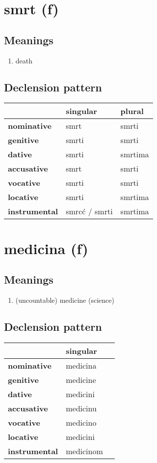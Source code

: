 \filbreak
\section{smrt (f)}
\subsection*{Meanings}
\begin{enumerate}
\item death
\end{enumerate}
\subsection*{Declension pattern}
\begin{tabularx}{\linewidth}{Xll}
\toprule
{} &       singular &   plural \\
\midrule
\textbf{nominative  } &           smrt &    smrti \\
\textbf{genitive    } &          smrti &   smrti \\
\textbf{dative      } &          smrti &  smrtima \\
\textbf{accusative  } &           smrt &    smrti \\
\textbf{vocative    } &          smrti &    smrti \\
\textbf{locative    } &          smrti &  smrtima \\
\textbf{instrumental} &  smrcć / smrti &  smrtima \\
\bottomrule
\end{tabularx}

\filbreak
\section{medicina (f)}
\subsection*{Meanings}
\begin{enumerate}
\item (uncountable) medicine (science)
\end{enumerate}
\subsection*{Declension pattern}
\begin{tabularx}{\linewidth}{Xll}
\toprule
{} &   singular \\
\midrule
\textbf{nominative  } &   medicina \\
\textbf{genitive    } &   medicine \\
\textbf{dative      } &   medicini \\
\textbf{accusative  } &   medicinu \\
\textbf{vocative    } &   medicino \\
\textbf{locative    } &   medicini \\
\textbf{instrumental} &  medicinom \\
\bottomrule
\end{tabularx}

